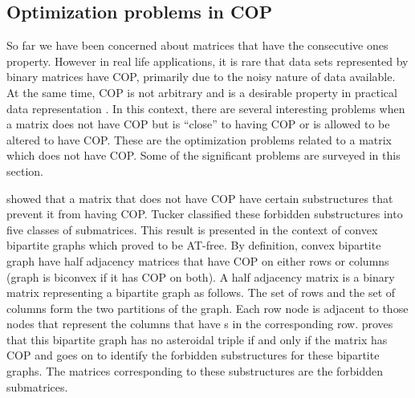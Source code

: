 \documentclass[MS]             %
              {iitmdiss_as}    %
\begin{document}
\subsection{Optimization problems in COP}
\label{sec:optcop}
So far we have been concerned about matrices that have the consecutive
ones property. However in real life applications, it is rare that data
sets represented by binary matrices have COP, primarily due to the
noisy nature of data available. At the same time, COP is not arbitrary
and is a desirable property in practical data representation
\cite{co98,jkckv04,k77}. In this context, there are several
interesting problems when a matrix does not have COP but is ``close''
to having COP or is allowed to be altered to have COP. These are the
optimization problems related to a matrix which does not have
COP. Some of the significant problems are surveyed in this section.

 \cite{at72} showed that a matrix that
does not have COP have certain substructures that prevent it from
having COP. Tucker classified these forbidden substructures into five
classes of submatrices. This result is presented in the context of
convex bipartite graphs which \cite{at72} proved to be
AT-free. By
definition, convex bipartite graph have half adjacency matrices that
have COP on either rows or columns (graph is biconvex if it has COP on
both)\cite{d08phd}. A half adjacency matrix is a binary matrix
representing a bipartite graph as follows. The set of rows and the set
of columns form the two partitions of the graph. Each row node is
adjacent to those nodes that represent the columns that have {\un}s in
the corresponding row. \cite{at72} proves that this bipartite graph
has no asteroidal triple if and only if the matrix has COP and goes on
to identify the forbidden substructures for these bipartite
graphs. The matrices corresponding to these substructures are the
forbidden submatrices.
\end{document}
